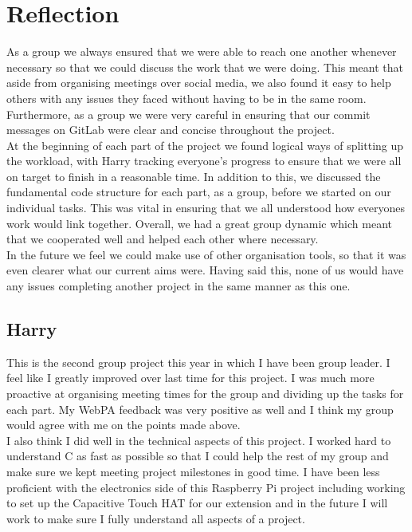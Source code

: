 \documentclass[11pt]{article}
\begin{document}
\section{Reflection}
As a group we always ensured that we were able to reach one another whenever necessary so that we could discuss the work that we were doing. This meant that aside from organising meetings over social media, we also found it easy to help others with any issues they faced without having to be in the same room. Furthermore, as a group we were very careful in ensuring that our commit messages on GitLab were clear and concise throughout the project.\\

At the beginning of each part of the project we found logical ways of splitting up the workload, with Harry tracking everyone's progress to ensure that we were all on target to finish in a reasonable time. In addition to this, we discussed the fundamental code structure for each part, as a group, before we started on our individual tasks. This was vital in ensuring that we all understood how everyones work would link together. Overall, we had a great group dynamic which meant that we cooperated well and helped each other where necessary. \\

In the future we feel we could make use of other organisation tools, so that it was even clearer what our current aims were. Having said this, none of us would have any issues completing another project in the same manner as this one.

\subsection{Harry}
This is the second group project this year in which I have been group leader. I feel like I greatly improved over last time for this project. I was much more proactive at organising meeting times for the group and dividing up the tasks for each part. My WebPA feedback was very positive as well and I think my group would agree with me on the points made above.\\

 I also think I did well in the technical aspects of this project. I worked hard to understand C as fast as possible so that I could help the rest of my group and make sure we kept meeting project milestones in good time. I have been less proficient with the electronics side of this Raspberry Pi project including working to set up the Capacitive Touch HAT for our extension and in the future I will work to make sure I fully understand all aspects of a project.
\end{document}
